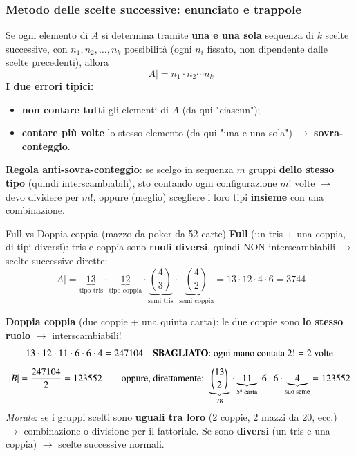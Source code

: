 \documentclass[12pt]{extarticle} %
\begin{document}
\subsubsection{Metodo delle scelte successive: enunciato e trappole}
Se ogni elemento di $A$ si determina tramite \textbf{una e una sola} sequenza di $k$ scelte successive, con $n_1, n_2, \dots, n_k$ possibilità (ogni $n_i$ fissato, non dipendente dalle scelte precedenti), allora
$$ |A| = n_1 \cdot n_2 \cdots n_k $$
\textbf{I due errori tipici:}
\begin{itemize}
    \item \textbf{non contare tutti} gli elementi di $A$ (da qui "ciascun");
    \item \textbf{contare più volte} lo stesso elemento (da qui "una e una sola") $\to$ \textbf{sovra-conteggio}.
\end{itemize}
\textbf{Regola anti-sovra-conteggio}: se scelgo in sequenza $m$ gruppi \textbf{dello stesso tipo} (quindi interscambiabili), sto contando ogni configurazione $m!$ volte $\to$ devo dividere per $m!$, oppure (meglio) scegliere i loro tipi \textbf{insieme} con una combinazione.
\begin{eserciziobox}{{Full vs Doppia coppia (mazzo da poker da 52 carte)}}
\textbf{Full} (un tris + una coppia, di tipi diversi): tris e coppia sono \textbf{ruoli diversi}, quindi NON interscambiabili $\to$ scelte successive dirette:
$$ |A| = \underbrace{13}_{\text{tipo tris}} \cdot \underbrace{12}_{\text{tipo coppia}} \cdot \underbrace{\binom{4}{3}}_{\text{semi tris}} \cdot \underbrace{\binom{4}{2}}_{\text{semi coppia}} = 13 \cdot 12 \cdot 4 \cdot 6 = 3744 $$

\textbf{Doppia coppia} (due coppie + una quinta carta): le due coppie sono \textbf{lo stesso ruolo} $\to$ interscambiabili!
$$ 13 \cdot 12 \cdot 11 \cdot 6 \cdot 6 \cdot 4 = 247104 \quad \text{\textbf{SBAGLIATO}: ogni mano contata } 2! = 2 \text{ volte} $$
$$ |B| = \frac{247104}{2} = 123552 \qquad \text{oppure, direttamente: } \underbrace{\binom{13}{2}}_{78} \cdot \underbrace{11}_{\text{5\textsuperscript{a} carta}} \cdot 6 \cdot 6 \cdot \underbrace{4}_{\text{suo seme}} = 123552 $$
\textit{Morale}: se i gruppi scelti sono \textbf{uguali tra loro} (2 coppie, 2 mazzi da 20, ecc.) $\to$ combinazione o divisione per il fattoriale. Se sono \textbf{diversi} (un tris e una coppia) $\to$ scelte successive normali.
\end{eserciziobox}
\end{document}
